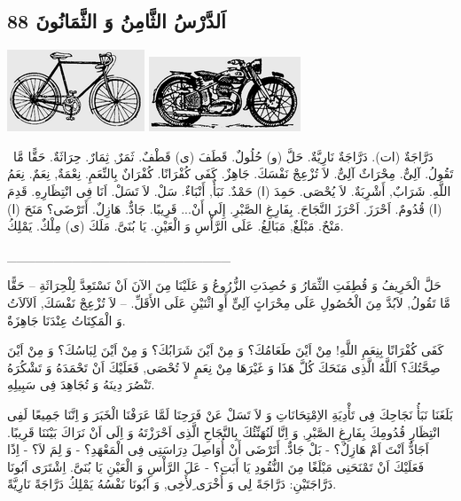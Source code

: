 \documentclass[a5paper]{article}
\begin{document}
\subsection[اَلدَّرْسُ الثَّامِنُ وَ الثَّمَانُونَ 88]{اَلدَّرْسُ الثَّامِنُ وَ الثَّمَانُونَ 88}
 \includegraphics[width=1.6146in,height=0.9583in]{images/MuhammadBagauddinprettified-img249.png}   \includegraphics[width=1.7811in,height=0.8752in]{images/MuhammadBagauddinprettified-img250.png} 

\ دَرَّاجَةٌ (ات). دَرَّاجَةٌ نَارِيَّةٌ. حَلَّ (و) حُلُولٌ. قَطَفَ (ى) قَطْفٌ. ثَمَرٌ, ثِمَارٌ. حِرَاثَةٌ. حَقًّا مَّا تَقُولُ. آلِىٌّ. مِحْرَاثٌ آلِىٌّ. لاَ تُزْعِجْ نَفْسَكَ. جَاهِزٌ. كَفَى كُفْرَانًا. كُفْرَانٌ بِالنِّعَمِ. نِعْمَةٌ, نِعَمٌ. نِعَمُ اللَّهِ. شَرَابٌ, أَشْرِبَةٌ. لاَ يُحْصَى. حَمِدَ (ا) حَمْدٌ. نَبَأٌ, أَنْبَاءٌ. سَلْ. لاَ تَسَلْ. اَنَا فِى انْتِظَارِهِ. قَدِمَ (ا) قُدُومٌ. اَحْرَزَ. اَحْرَزَ النَّجَاحَ. بِفَارِغِ الصَّبْرِ. إِلَى أَنْ... قَرِيبًا. جَادٌّ. هَازِلٌ. أَتَرْضَى؟ مَنَحَ (ا) مَنْحٌ. مَبْلَغٌ, مَبَالِغُ. عَلَى الرَّأْسِ وَ الْعَيْنِ. يَا بُنَىَّ. مَلَكَ (ى) مِلْكٌ. يَمْلِكُ.

\_\_\_\_\_\_\_\_\_\_\_\_\_\_\_\_\_\_\_\_\_\_\_\_

حَلَّ الْخَرِيفُ وَ قُطِفَتِ الثِّمَارُ وَ حُصِدَتِ الزُّرُوعُ وَ عَلَيْنَا مِنَ الآنَ اَنْ نَسْتَعِدَّ لِلْحِرَاثَةِ – حَقًّا مَّا تَقُولُ, لاَبُدَّ مِنَ الْحُصُولِ عَلَى مِحْرَاثٍ آلِىٍّ أَوِ اثْنَيْنِ عَلَى الأَقَلِّ. – لاَ تُزْعِجْ نَفْسَكَ, اَلآلاَتُ وَ الْمَكِنَاتُ عِنْدَنَا جَاهِزَةٌ.

كَفَى كُفْرَانًا بِنِعَمِ اللَّهِ! مِنْ اَيْنَ طَعَامُكَ؟ وَ مِنْ اَيْنَ شَرَابُكَ؟ وَ مِنْ اَيْنَ لِبَاسُكَ؟ وَ مِنْ اَيْنَ صِحَّتُكَ؟ اَللَّهُ الَّذِى مَنَحَكَ كُلَّ هَذَا وَ غَيْرَهَا مِنْ نِعَمٍ لاَ تُحْصَى, فَعَلَيْكَ اَنْ تَحْمَدَهُ وَ تَشْكُرَهُ تَنْصُرَ دِينَهُ وَ تُجَاهِدَ فِى سَبِيلِهِ.

بَلَغَنَا نَبَأُ نَجَاحِكَ فِى تَأْدِيَةِ الاِمْتِحَانَاتِ وَ لاَ تَسَلْ عَنْ فَرَحِنَا لَمَّا عَرَفْنَا الْخَبَرَ وَ اِنَّنَا جَمِيعًا لَفِى انْتِظَارِ قُدُومِكَ بِفَارِغِ الصَّبْرِ, وَ اِنَّا لَنُهَنِّئُكَ بِالنَّجَاحِ الَّذِى اَحْرَزْتَهُ وَ اِلَى اَنْ نَرَاكَ بَيْنَنَا قَرِيبًا. اَجَادٌّ اَنْتَ اَمْ هَازِلٌ؟ - بَلْ جَادٌّ. أَتَرْضَى أَنْ أُوَاصِلَ دِرَاسَتِى فِى الْمَعْهَدِ؟ - وَ لِمَ لاَ؟ - اِذًا فَعَلَيْكَ اَنْ تَمْنَحَنِى مَبْلَغًا مِنَ النُّقُودِ يَا أَبَتِ؟ - عَلَ الرَّأْسِ وَ الْعَيْنِ يَا بُنَىَّ. اِشْتَرَى اَبُونَا دَرَّاجَتَيْنِ: دَرَّاجَةً لِى وَ أُخْرَى ِلأَخِى, وَ اَبُونَا نَفْسُهُ يَمْلِكُ دَرَّاجَةً نَارِيَّةً.
\end{document}
